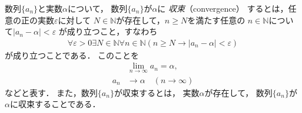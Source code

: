      数列$\{ a_n \}$と実数$\alpha$について，
     数列$\{ a_n \}$が$\alpha$に
     \emph{収束}（convergence）
     するとは，任意の正の実数$\varepsilon$に対して
     $N \in \mathbb{N}$が存在して，$n \geq N$を満たす任意の
     $n \in \mathbb{N}$について$\lvert a_n - \alpha \rvert < \varepsilon$
     が成り立つこと，すなわち
     \begin{align}
       \forall \varepsilon > 0 \exists N \in \mathbb{N} \forall n \in \mathbb{N}
       ( n \geq N \to \lvert a_n - \alpha \rvert < \varepsilon)
       \label{eq:suretuconv}
     \end{align}
     が成り立つことである．
     このことを
     \begin{align}
       & \lim_{n \to \infty}  a_n = \alpha ,
       \label{eq:suretulim} \\
       a_n & \to \alpha \quad ( n \to \infty)
       \label{eq:suretutolim}
     \end{align}
     などと表す．
     また，数列$\{ a_n \}$が収束するとは，
     実数$\alpha$が存在して，
     数列$\{ a_n \}$が$\alpha$に収束することである．

